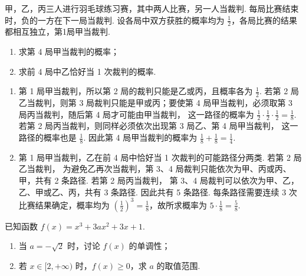 \begin{problem}
甲，乙，丙三人进行羽毛球练习赛，其中两人比赛，另一人当裁判. 每局比赛结束时，负的一方在下一局当裁判. 设各局中双方获胜的概率均为 \(\frac{1}{2}\)，各局比赛的结果都相互独立，第1局甲当裁判.

\begin{enumerate}
\item 求第 4 局甲当裁判的概率；
\item 求前 4 局中乙恰好当 1 次裁判的概率.
\end{enumerate}
\end{problem}

\begin{solution}
\begin{enumerate}
\item 第 1 局甲当裁判，所以第 2 局的裁判只能是乙或丙，且概率各为 \(\frac{1}{2}\).
若第 2 局乙当裁判，则第 3 局裁判只能是甲或丙；要使第 4 局甲当裁判，必须取第 3 局丙当裁判，随后第 4 局才可能由甲当裁判，
这一路径的概率为 \(\frac{1}{2}\cdot\frac{1}{2}\cdot\frac{1}{2}=\frac{1}{8}\). 若第 2 局丙当裁判，则同样必须依次出现第 3 局乙、第 4 局甲当裁判，
这一路径的概率也是 \(\frac{1}{8}\).
因此第 4 局甲当裁判的概率为 \(\frac{1}{8}+\frac{1}{8}=\frac{1}{4}\).

\item 第 1 局甲当裁判，乙在前 4 局中恰好当 1 次裁判的可能路径分两类. 若第 2 局乙当裁判，
为避免乙再次当裁判，第 3、4 局裁判只能依次为甲、丙或丙、甲，共有 2 条路径. 若第 2 局丙当裁判，
第 3、4 局裁判可以依次为甲、乙，乙、甲或乙、丙，共有 3 条路径.
因此共有 5 条路径. 每条路径需要连续 3 次比赛结果确定，概率均为
\(\left(\frac{1}{2}\right)^3=\frac{1}{8}\)，故所求概率为
\(5\cdot\frac{1}{8}=\frac{5}{8}\).
\end{enumerate}
\end{solution}

\begin{problem}
已知函数 \( f(x) = x^3 + 3ax^2 + 3x + 1 \).

\begin{enumerate}
\item 当 \(a = -\sqrt{2}\) 时，讨论 \(f(x)\) 的单调性；
\item 若 \(x \in [2, +\infty)\) 时，\(f(x) \geqslant 0\)，求 \(a\) 的取值范围.
\end{enumerate}
\end{problem}

